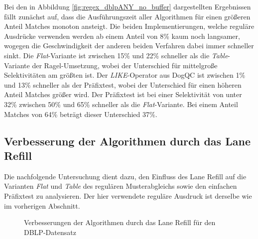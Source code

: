 Bei den in Abbildung \ref{fig:regex_dblpANY_no_buffer} dargestellten Ergebnissen fällt zunächst auf, dass die Ausführungszeit aller Algorithmen für einen größeren Anteil Matches monoton ansteigt.
Die beiden Implementierungen, welche reguläre Ausdrücke verwenden werden ab einem Anteil von 8\% kaum noch langsamer, wogegen die Geschwindigkeit der anderen beiden Verfahren dabei immer schneller sinkt.
Die \emph{Flat}-Variante ist zwischen 15\% und 22\% schneller als die \emph{Table}-Variante der Ragel-Umsetzung, wobei der Unterschied für mittelgroße Selektivitäten am größten ist.
Der \emph{LIKE}-Operator aus DogQC ist zwischen 1\% und 13\% schneller als der Präfixtest, wobei der Unterschied für einen höheren Anteil Matches größer wird.
Der Präfixtest ist bei einer Selektivität von unter 32\% zwischen 50\% und 65\% schneller als die \emph{Flat}-Variante.
Bei einem Anteil Matches von 64\% beträgt dieser Unterschied 37\%.

\subsection{Verbesserung der Algorithmen durch das Lane Refill}

Die nachfolgende Untersuchung dient dazu, den Einfluss des Lane Refill auf die Varianten \emph{Flat} und \emph{Table} des regulären Musterabgleichs sowie den einfachen Präfixtest zu analysieren.
Der hier verwendete reguläre Ausdruck ist derselbe wie im vorherigen Abschnitt.

\begin{figure}[ht]
	\centering
	\caption{Verbesserungen der Algorithmen durch das Lane Refill für den DBLP-Datensatz}
	\label{fig:regex_dblpANY_buffer}
\end{figure}

